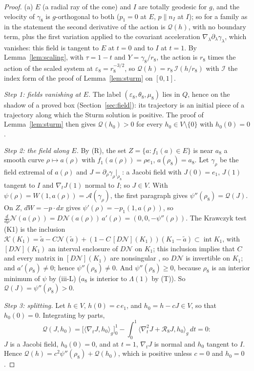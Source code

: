 \documentclass[11pt]{article}
\theoremstyle{definition}
\begin{document}
\begin{proof}
(a) $E$ (a radial ray of the cone) and $I$ are totally geodesic for $g$, and the velocity of $\gamma_8$ is $g$-orthogonal to both
($p_1=0$ at $E$, $p\parallel n_I$ at $I$); so for a family as in the statement the second
derivative of the action is $\mathcal Q(h)$, with no boundary term, plus the first variation applied to the covariant
acceleration $\nabla_\lambda\partial_\lambda\gamma_\lambda$, which vanishes: this field is tangent to $E$ at $t=0$ and to
$I$ at $t=1$. By Lemma~\ref{lem:scaling}, with
$\tau=1-t$ and $Y=\gamma_8/r_8$, the action is $r_8$ times the action of the scaled system at
$\varepsilon_8=r_8^{-3/2}$, so $\mathcal Q(h)=r_8\,\mathcal I(h/r_8)$ with $\mathcal I$ the index form of the proof of
Lemma~\ref{lem:sturm} on $[0,1]$.

\emph{Step 1: fields vanishing at $E$.} The label $(\varepsilon_8,\theta_8,\mu_8)$ lies in $Q$, hence on the shadow of a
proved box (Section~\ref{sec:field}): its trajectory is an initial piece of a trajectory along which the Sturm solution
is positive. The proof of Lemma~\ref{lem:sturm} then gives $\mathcal Q(h_0)>0$ for every $h_0\in V\setminus\{0\}$ with
$h_0(0)=0$.

\emph{Step 2: the field along $E$.} By (R), the set $Z=\{a:f_1(a)\in E\}$ is near $a_8$ a smooth curve $\rho\mapsto a(\rho)$
with $f_1(a(\rho))=\rho e_1$, $a(\rho_8)=a_8$. Let $\gamma_\rho$ be the field extremal of $a(\rho)$ and
$J=\partial_\rho\gamma_\rho|_{\rho_8}$: a Jacobi field with $J(0)=e_1$, $J(1)$ tangent to $I$ and $\nabla_tJ(1)$ normal to
$I$; so $J\in V$. With $\psi(\rho)=W(1,a(\rho))=\mathcal A(\gamma_\rho)$, the first paragraph gives $\psi''(\rho_8)=\mathcal Q(J)$.
On $Z$, $dW=-p\cdot dx$ gives $\psi'(\rho)=-p_1(1,a(\rho))$, so
$\frac{d}{d\rho}\mathcal N(a(\rho))=D\mathcal N(a(\rho))\,a'(\rho)=(0,0,-\psi''(\rho))$. The Krawczyk test (K1) is the inclusion
$\mathcal K(K_1)=\tilde a-C\mathcal N(\tilde a)+(1-C\,[D\mathcal N](K_1))(K_1-\tilde a)\subset\operatorname{int}K_1$, with
$[D\mathcal N](K_1)$ an interval enclosure of $D\mathcal N$ on $K_1$; this inclusion implies that $C$ and every matrix in
$[D\mathcal N](K_1)$ are nonsingular \cite[Ch.~5]{Neumaier}, so $D\mathcal N$ is invertible on $K_1$; and $a'(\rho_8)\ne0$; hence $\psi''(\rho_8)\ne0$. And
$\psi''(\rho_8)\ge0$, because $\rho_8$ is an interior minimum of $\psi$ by (iii-L) ($a_8$ is interior to $\Lambda(1)$ by (T)). So
$\mathcal Q(J)=\psi''(\rho_8)>0$.

\emph{Step 3: splitting.} Let $h\in V$, $h(0)=c\,e_1$, and $h_0=h-cJ\in V$, so that $h_0(0)=0$. Integrating by parts,
\[
\mathcal Q(J,h_0)=\bigl[\langle\nabla_tJ,h_0\rangle_g\bigr]_0^1-\int_0^1\langle\nabla_t^2J+\mathcal R_8J,h_0\rangle_g\,dt=0:
\]
$J$ is a Jacobi field, $h_0(0)=0$, and at $t=1$, $\nabla_tJ$ is normal and $h_0$ tangent to $I$. Hence
$\mathcal Q(h)=c^2\psi''(\rho_8)+\mathcal Q(h_0)$, which is positive unless $c=0$ and $h_0=0$.


\end{proof}
\end{document}
